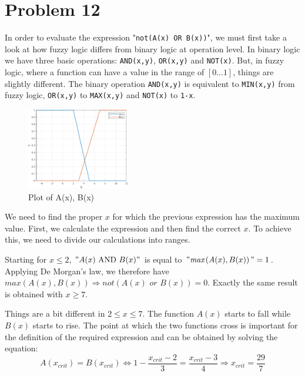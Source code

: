 \section{Problem 12}

In order to evaluate the expression "\verb|not(A(x) OR B(x))|", we must first take a look at how fuzzy logic differs from binary logic at operation level.
In binary logic we have three basic operations: \verb*|AND(x,y)|, \verb*|OR(x,y)| and \verb*|NOT(x)|. But, in fuzzy logic, where a function can have a value in the range of $\left[0...1\right]$, things are slightly different.
The binary operation \verb*|AND(x,y)| is equivalent to \verb|MIN(x,y)| from fuzzy logic, \verb*|OR(x,y)| to \verb*|MAX(x,y)| and \verb*|NOT(x)| to \verb|1-x|.

\begin{figure}
	\vspace{-0.5cm}
	\centering
	\includegraphics[width=0.4\textwidth]{../Problem 12/a_b_functions.pdf}
	\caption{Plot of A(x), B(x)}
	\label{fig:prob_12_a_b}
\end{figure}

We need to find the proper $x$ for which the previous expression has the maximum value. First, we calculate the expression and then find the correct $x$.
To achieve this, we need to divide our calculations into ranges. 

Starting for $x \le 2$, $"A(x) \text{ AND } B(x)"$ is equal to $"\textit{max}\left(A(x), B(x)\right)" = 1$. Applying De Morgan's law, we therefore have $\textit{max}\left(A(x), B(x)\right) \Rightarrow \textit{not}\left(A(x) \textit{ or } B(x)\right) = 0$.
Exactly the same result is obtained with $x \ge 7$.

Things are a bit different in $2 \le x \le 7$. The function $A(x)$ starts to fall while $B(x)$ starts to rise. The point at which the two functions cross is important for the definition of the required expression and can be obtained by solving the equation:
\[
A(x_{crit}) = B(x_{crit}) \Leftrightarrow 1 - \frac{x_{crit}-2}{3} = \frac{x_{crit}-3}{4} \Rightarrow x_{crit} = \frac{29}{7}
\]

